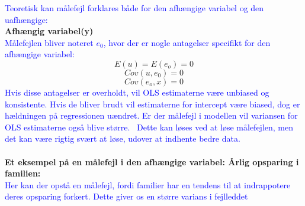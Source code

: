 \documentclass[
  10pt,
]{article}
\begin{document}
\textcolor{blue}{Teoretisk kan målefejl forklares både for den afhængige variabel og den uafhængige:}\\
\textbf{Afhængig variabel(y)}\\
\textcolor{blue}{Målefejlen bliver noteret $e_0$, hvor der er nogle antagelser specifikt for den afhængige variabel: }
\[ E(u)=E(e_o)=0\] \[ Cov(u,e_0)=0\] \[ Cov(e_o,x)=0\]
\textcolor{blue}{Hvis disse antagelser er overholdt, vil OLS estimaterne være unbiased og konsistente. Hvis de bliver brudt vil estimaterne for intercept være biased, dog er hældningen på regressionen uændret. Er der målefejl i modellen vil variansen for OLS estimaterne også blive større. \
Dette kan løses ved at løse målefejlen, men det kan være rigtig svært at løse, udover at indhente bedre data.}\\
~\\
\textbf{Et eksempel på en målefejl i den afhængige variabel: Årlig opsparing i familien:}\\
\textcolor{blue}{Her kan der opstå en målefejl, fordi familier har en tendens til at indrappotere deres opsparing forkert. Dette giver os en større varians i fejlleddet}\\
\newpage
\end{document}
